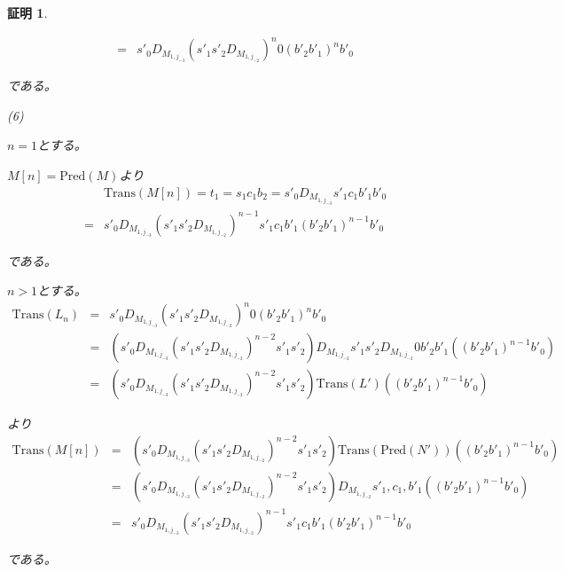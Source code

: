 \documentclass[dvipdfmx,uplatex]{jsarticle}
\theoremstyle{customnonumberbreakfortheorem}
\theoremstyle{customnonumberbreakforproof}
\newtheorem{hideableproof}{証明}
\begin{document}
\begin{hideableproof}
\begin{indented}
\begin{indented}
\begin{eqnarray*}
			& = & s'_0 D_{M_{1,j_{-3}}} (s'_1 s'_2 D_{M_{1,j_{-2}}})^n 0 (b'_2 b'_1)^n b'_0
			\end{eqnarray*}
			\item である。
		\end{indented}
		\item
		\item (6)
		\item \(n=1\)とする。
		\begin{indented}
			\item \(M[n] = \textrm{Pred}(M)\)より
			\begin{eqnarray*}
			& & \textrm{Trans}(M[n]) = t_1 = s_1 c_1 b_2 = s'_0 D_{M_{1,j_{-3}}} s'_1 c_1 b'_1 b'_0 \\
			& = & s'_0 D_{M_{1,j_{-3}}} (s'_1 s'_2 D_{M_{1,j_{-2}}})^{n-1} s'_1 c_1 b'_1 (b'_2 b'_1)^{n-1} b'_0
			\end{eqnarray*}
			\item である。
		\end{indented}
		\item
		\item \(n > 1\)とする。
		\begin{eqnarray*}
		\textrm{Trans}(L_n) & = & s'_0 D_{M_{1,j_{-3}}} (s'_1 s'_2 D_{M_{1,j_{-2}}})^n 0 (b'_2 b'_1)^n b'_0 \\
		& = & (s'_0 D_{M_{1,j_{-3}}} (s'_1 s'_2 D_{M_{1,j_{-2}}})^{n-2} s'_1 s'_2) D_{M_{1,j_{-2}}} s'_1 s'_2 D_{M_{1,j_{-2}}} 0 b'_2 b'_1 ((b'_2 b'_1)^{n-1} b'_0) \\
		& = & (s'_0 D_{M_{1,j_{-3}}} (s'_1 s'_2 D_{M_{1,j_{-2}}})^{n-2} s'_1 s'_2) \textrm{Trans}(L') ((b'_2 b'_1)^{n-1} b'_0)
		\end{eqnarray*}
		\begin{indented}
			\item より
			\begin{eqnarray*}
			\textrm{Trans}(M[n]) & = & (s'_0 D_{M_{1,j_{-3}}} (s'_1 s'_2 D_{M_{1,j_{-2}}})^{n-2} s'_1 s'_2) \textrm{Trans}(\textrm{Pred}(N')) ((b'_2 b'_1)^{n-1} b'_0) \\
			& = & (s'_0 D_{M_{1,j_{-3}}} (s'_1 s'_2 D_{M_{1,j_{-2}}})^{n-2} s'_1 s'_2) D_{M_{1,j_{-2}}} s'_1,c_1,b'_1 ((b'_2 b'_1)^{n-1} b'_0) \\
			& = & s'_0 D_{M_{1,j_{-3}}} (s'_1 s'_2 D_{M_{1,j_{-2}}})^{n-1} s'_1 c_1 b'_1 (b'_2 b'_1)^{n-1} b'_0
			\end{eqnarray*}
			\item である。
		\end{indented}
	\end{indented}
\end{hideableproof}
\end{document}
